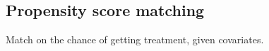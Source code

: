 
\subsection{Propensity score matching}

Match on the chance of getting treatment, given covariates.

